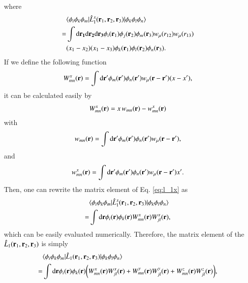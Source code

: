 \documentclass[aip,jcp,reprint,noshowkeys,superscriptaddress]{revtex4-1}
\newcommand{\matelem}[3]{\langle #1 | #2 | #3 \rangle}
\newcommand{\bri}[1]{{\bf r}_{#1}}
\newcommand{\dr}[1]{\text{d}{\bf r_{#1}}}
\begin{document}
where 
\begin{equation}
 \begin{aligned}
 \label{eq:l_1x}
& \matelem{\phi_i \phi_k \phi_m}{\hat{L}_1^x(\bri{1},\bri{2},\bri{3})}{\phi_k \phi_l \phi_n} \\  
 = & \int \dr{1} \dr{2} \dr{3} \phi_i(\bri{1}) \phi_j(\bri{2}) \phi_m(\bri{3}) w_{\mu}(r_{12}) w_{\mu}(r_{13}) \\ 
 &(x_1 - x_2) (x_1 - x_3) \phi_k(\bri{1}) \phi_l(\bri{2}) \phi_n(\bri{3}).
 \end{aligned}
\end{equation}
If we define the following function 
\begin{equation}
 W_{mn}^x({\bf r})  = \int \text{d}{\bf r'} \phi_m({\bf r}') \phi_n({\bf r}') w_{\mu}({\bf r} - {\bf r'}) (x - x'),  
\end{equation}
it can be calculated easily by
\begin{equation}
 W_{mn}^x({\bf r})  = x \, w_{mn}({\bf r}) - w_{mn}^x({\bf r})
\end{equation}
with 
\begin{equation}
 w_{mn}({\bf r}) = \int \text{d}{\bf r'} \phi_m({\bf r}') \phi_n({\bf r}') w_{\mu}({\bf r} - {\bf r'}), 
\end{equation}
and 
\begin{equation}
  w_{mn}^x({\bf r}) = \int \text{d}{\bf r'} \phi_m({\bf r}') \phi_n({\bf r}') w_{\mu}({\bf r} - {\bf r'})  x'.
\end{equation}
Then, one can rewrite the matrix element of Eq. \eqref{eq:l_1x} as
\begin{equation}
 \begin{aligned}
 \label{eq:l_1x_2}
& \matelem{\phi_i \phi_k \phi_m}{\hat{L}_1^x(\bri{1},\bri{2},\bri{3})}{\phi_k \phi_l \phi_n} \\  
 = & \int \text{d}{\bf r} \phi_i({\bf r})  \phi_k({\bf r}) W_{mn}^x({\bf r}) W_{jl}^x({\bf r}),
 \end{aligned}
\end{equation}
which can be easily evaluated numerically. 
Therefore, the matrix element of the $\hat{L}_1(\bri{1},\bri{2},\bri{3})$ is simply 
\begin{equation}
 \begin{aligned}
 & \matelem{\phi_i \phi_k \phi_m}{\hat{L}_1(\bri{1},\bri{2},\bri{3})}{\phi_k \phi_l \phi_n} \\
 = & \int \text{d}{\bf r} \phi_i({\bf r})  \phi_k({\bf r}) \bigg( W_{mn}^x({\bf r}) W_{jl}^x({\bf r}) + W_{mn}^y({\bf r}) W_{jl}^y({\bf r}) + W_{mn}^z({\bf r}) W_{jl}^z({\bf r})\bigg),
 \end{aligned}
\end{equation}
\end{document}
